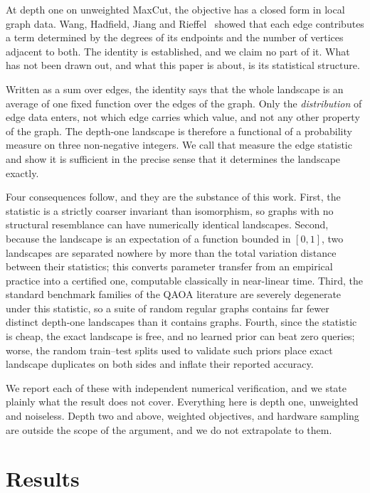 \documentclass[10pt,letterpaper]{article}
\theoremstyle{definition}
\begin{document}
At depth one on unweighted MaxCut, the objective has a closed form in local
graph data. Wang, Hadfield, Jiang and Rieffel~\cite{wang2018fermionic} showed
that each edge contributes a term determined by the degrees of its endpoints
and the number of vertices adjacent to both. The identity is established, and
we claim no part of it. What has not been drawn out, and what this paper is
about, is its statistical structure.

Written as a sum over edges, the identity says that the whole landscape is an
average of one fixed function over the edges of the graph. Only the
\emph{distribution} of edge data enters, not which edge carries which value,
and not any other property of the graph. The depth-one landscape is therefore a
functional of a probability measure on three non-negative integers. We call
that measure the edge statistic and show it is sufficient in the precise sense
that it determines the landscape exactly.

Four consequences follow, and they are the substance of this work. First, the
statistic is a strictly coarser invariant than isomorphism, so graphs with no
structural resemblance can have numerically identical landscapes. Second,
because the landscape is an expectation of a function bounded in $[0,1]$, two
landscapes are separated nowhere by more than the total variation distance
between their statistics; this converts parameter transfer from an empirical
practice into a certified one, computable classically in near-linear time.
Third, the standard benchmark families of the QAOA literature are severely
degenerate under this statistic, so a suite of random regular graphs contains
far fewer distinct depth-one landscapes than it contains graphs. Fourth, since
the statistic is cheap, the exact landscape is free, and no learned prior can
beat zero queries; worse, the random train--test splits used to validate such
priors place exact landscape duplicates on both sides and inflate their
reported accuracy.

We report each of these with independent numerical verification, and we state
plainly what the result does not cover. Everything here is depth one, unweighted
and noiseless. Depth two and above, weighted objectives, and hardware sampling
are outside the scope of the argument, and we do not extrapolate to them.

\section{Results}
\end{document}
